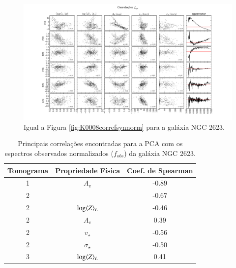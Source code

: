 \begin{figure}
    \includegraphics[width=1.2\textwidth, angle=-90]{figuras/K0213-correl-f_syn_norm-PCvsPhys.pdf}
	\caption[Correlações PCs vs. par\^ametros f\'isicos - $f_{syn}$ - NGC 2623.]
	{Igual a Figura \ref{fig:K0008correfsynnorm} para a galáxia NGC 2623.}
    \label{fig:K0213correfsynnorm}
\end{figure}

\begin{table}
	\caption[Principais correlações - $f_{obs}$ - NGC 2623]
	{Principais correlações encontradas para a PCA com os espectros observados normalizados ($f_{obs}$) da galáxia NGC
	2623.}
	\begin{tabular}{c c c}
		Tomograma & Propriedade Física & Coef. de Spearman \\ 
		\midrule
		1 & $A_v$            & -0.89 \\
		2 & \meanL{\log t}   & -0.67 \\
		2 & $\log \meanL{Z}$ & -0.46 \\
		2 & $A_v$            & 0.39 \\
		2 & $v_\star$        & -0.56 \\
		2 & $\sigma_\star$   & -0.50 \\
		3 & $\log \meanL{Z}$ & 0.41 \\
		\end{tabular}
	\label{tab:K0213tabcorreobs}
\end{table}

